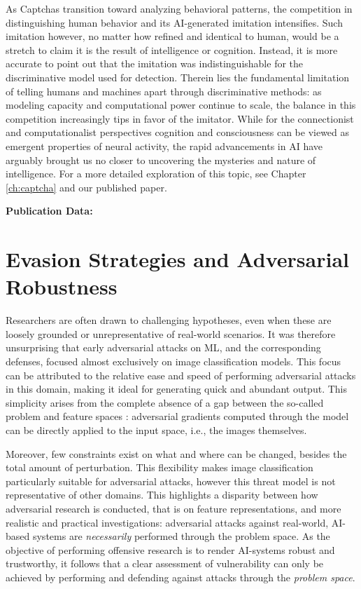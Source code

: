 As Captchas transition toward analyzing behavioral patterns, the competition in distinguishing human behavior and its AI-generated imitation intensifies. 
Such imitation however, no matter how refined and identical to human, would be a stretch to claim it is the result of intelligence or cognition.
Instead, it is more accurate to point out that the imitation was indistinguishable for the discriminative model used for detection.
Therein lies the fundamental limitation of telling humans and machines apart through discriminative methods: as modeling capacity and computational power continue to scale, the balance in this competition increasingly tips in favor of the imitator. 
While for the connectionist and computationalist perspectives cognition and consciousness can be viewed as emergent properties of neural activity, the rapid advancements in \gls{AI} have arguably brought us no closer to uncovering the mysteries and nature of intelligence.
For a more detailed exploration of this topic, see Chapter \ref{ch:captcha} and our published paper.

\textbf{Publication Data:} 

\section{Evasion Strategies and Adversarial Robustness}

Researchers are often drawn to challenging hypotheses, even when these are loosely grounded or unrepresentative of real-world scenarios.
It was therefore unsurprising that early adversarial attacks on \gls{ML}, and the corresponding defenses, focused almost exclusively on image classification models.
This focus can be attributed to the relative ease and speed of performing adversarial attacks in this domain, making it ideal for generating quick and abundant output.
This simplicity arises from the complete absence of a gap between the so-called problem and feature spaces \cite{pierazzi2020intriguing}: adversarial gradients computed through the model can be directly applied to the input space, i.e., the images themselves.

Moreover, few constraints exist on what and where can be changed, besides the total amount of perturbation.
This flexibility makes image classification particularly suitable for adversarial attacks, however this threat model is not representative of other domains.
This highlights a disparity between how adversarial research is conducted, that is on feature representations, and more realistic and practical investigations: adversarial attacks against real-world, AI-based systems are \textit{necessarily} performed through the problem space.
As the objective of performing offensive research is to render AI-systems robust and trustworthy, it follows that a clear assessment of vulnerability can only be achieved by performing and defending against attacks through the \textit{problem space}.

